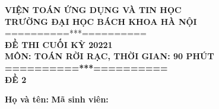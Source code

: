 \documentclass[12pt, a4paper]{article}
\begin{document}

\begin{center}
    \textbf{VIỆN TOÁN ỨNG DỤNG VÀ TIN HỌC}\\
    \textbf{TRƯỜNG ĐẠI HỌC BÁCH KHOA HÀ NỘI}\\
    ==========***==========
    \\ \textbf{ĐỀ THI CUỐI KỲ 20221\\
    MÔN: TOÁN RỜI RẠC, THỜI GIAN: 90 PHÚT\\ ==========***==========\\ ĐỀ 2}
\end{center}
\indent \textbf{Họ và tên:} \hspace{10cm}\textbf{Mã sinh viên:}
\end{document}
